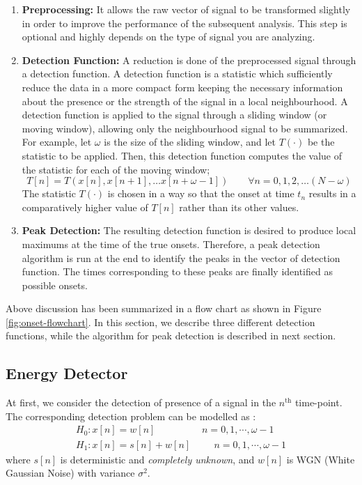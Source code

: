 \documentclass[10pt]{article}
\begin{document}
\begin{enumerate}
    \item \textbf{Preprocessing:} It allows the raw vector of signal to be transformed slightly in order to improve the performance of the subsequent analysis. This step is optional and highly depends on the type of signal you are analyzing.
    \item \textbf{Detection Function:} A reduction is done of the preprocessed signal through a detection function. A detection function is a statistic which sufficiently reduce the data in a more compact form keeping the necessary information about the presence or the strength of the signal in a local neighbourhood. A detection function is applied to the signal through a sliding window (or moving window), allowing only the neighbourhood signal to be summarized. For example, let $\omega$ is the size of the sliding window, and let $T(\cdot)$ be the statistic to be applied. Then, this detection function computes the value of the statistic for each of the moving window;
    $$T[n] = T(x[n], x[n+1], \dots x[n+\omega - 1]) \qquad \forall n = 0,1,2, \dots (N-\omega)$$
    The statistic $T(\cdot)$ is chosen in a way so that the onset at time $t_n$ results in a comparatively higher value of $T[n]$ rather than its other values.
    \item \textbf{Peak Detection:} The resulting detection function is desired to produce local maximums at the time of the true onsets. Therefore, a peak detection algorithm is run at the end to identify the peaks in the vector of detection function. The times corresponding to these peaks are finally identified as possible onsets.
\end{enumerate}

Above discussion has been summarized in a flow chart as shown in Figure \ref{fig:onset-flowchart}. In this section, we describe three different detection functions, while the algorithm for peak detection is described in next section.


\subsection{Energy Detector}
\qquad At first, we consider the detection of presence of a signal in the $n^\text{th}$ time-point. The corresponding detection problem can be modelled as :
\begin{align*}
 H_0: x[n]=w[n]  \hspace{2cm}  n=0,1,\cdots, \omega-1\\ 
 H_1: x[n]=s[n]+w[n] \hspace{1cm} n=0,1,\cdots, \omega-1 
 \end{align*}
where $s[n]$ is deterministic and \textit{completely unknown}, and $w[n]$ is WGN (White Gaussian Noise) with variance $\sigma^2$. 
\end{document}
